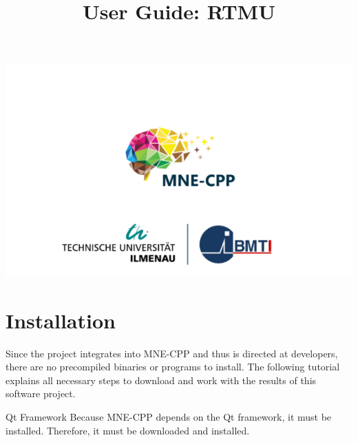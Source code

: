 



	
\title{User Guide: RTMU}
\vspace{3 in}
\maketitle

\includegraphics[width = \linewidth]{figures/mne-cpp.png}

\clearpage


\tableofcontents

\clearpage


\section{Installation}

Since the project integrates into MNE-CPP and thus is directed at developers, there are no precompiled binaries or programs to install. The following tutorial explains all necessary steps to download and work with the results of this software project.

\begin{aims}
	\item[\hspace*{11mm} Qt Framework] Because MNE-CPP depends on the Qt framework, it must be installed. Therefore, it must be downloaded and installed.
\end{aims}


